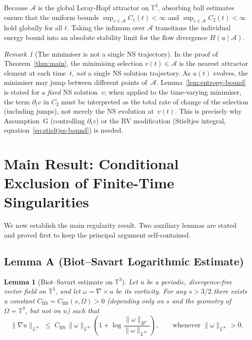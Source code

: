 \documentclass[12pt,a4paper]{article}
\theoremstyle{definition}
\theoremstyle{plain}
\newtheorem{lemma}[definition]{Lemma}
\theoremstyle{remark}
\newtheorem{remark}[definition]{Remark}
\begin{document}
Because $\mathcal{A}$ is the global Leray-Hopf attractor on $\mathbb{T}^3$, absorbing ball estimates ensure that the uniform bounds $\sup_{v \in \mathcal{A}} C_1(t) < \infty$ and $\sup_{v \in \mathcal{A}} C_2(t) < \infty$ hold globally for all $t$. Taking the infimum over $\mathcal{A}$ transitions the individual energy bound into an absolute stability limit for the flow divergence $H(u \mid \mathcal{A})$.

\begin{remark}[The minimiser is not a single NS trajectory]
\label{rem:minimiser-trajectory}
In the proof of Theorem~\ref{thm:main}, the minimising selection
$v(t) \in \mathcal{A}$ is the nearest attractor element at each time~$t$,
\emph{not} a single NS solution trajectory.  As $u(t)$ evolves, the
minimiser may jump between different points of~$\mathcal{A}$.
Lemma~\ref{lem:entropy-bound} is stated for a \emph{fixed} NS solution~$v$;
when applied to the time-varying minimiser, the term $\partial_t v$ in
$C_2$ must be interpreted as the total rate of change of the selection
(including jumps), not merely the NS evolution at~$v(t)$.  This is
precisely why Assumption~G (controlling $\partial_t v$) or the BV
modification (Stieltjes integral, equation~\eqref{eq:stieltjes-bound})
is needed.
\end{remark}

\section{Main Result: Conditional Exclusion of Finite-Time Singularities}

We now establish the main regularity result. Two auxiliary lemmas are stated and
proved first to keep the principal argument self-contained.

\subsection*{Lemma A (Biot--Savart Logarithmic Estimate)}
\begin{lemma}[Biot--Savart estimate on $\mathbb{T}^3$]
\label{lem:BS}
Let $u$ be a periodic, divergence-free vector field on $\mathbb{T}^3$, and let
$\omega = \nabla\times u$ be its vorticity.  For any $s > 3/2$ there exists a
constant $C_{\mathrm{BS}} = C_{\mathrm{BS}}(s,\Omega) > 0$ (depending only on
$s$ and the geometry of $\Omega = \mathbb{T}^3$, but \emph{not} on $u$) such that
\begin{equation}\label{eq:BS}
    \|\nabla u\|_{L^\infty}
    \;\le\;
    C_{\mathrm{BS}}\,\|\omega\|_{L^\infty}
    \!\left(1 + \log\frac{\|\omega\|_{H^s}}{\|\omega\|_{L^\infty}}\right),
    \qquad \text{whenever } \|\omega\|_{L^\infty} > 0.
\end{equation}
\end{lemma}
\end{document}
